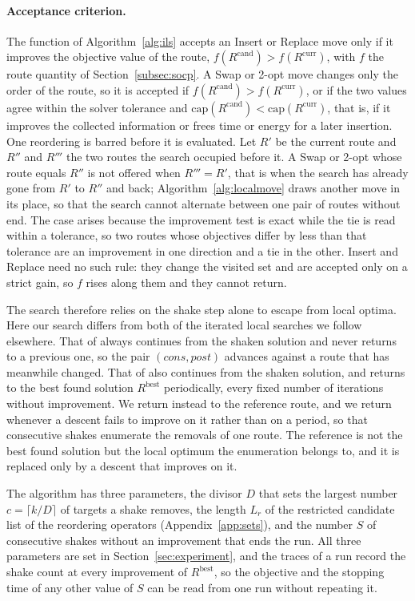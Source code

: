 \documentclass[11pt]{article}
\newcommand{\Rcurr}{R^{\mathrm{curr}}}   %
\newcommand{\Rcand}{R^{\mathrm{cand}}}   %
\newcommand{\Rbest}{R^{\mathrm{best}}}   %
\begin{document}
\paragraph{Acceptance criterion.}
The function \FAccept{$\Rcand, \Rcurr$} of Algorithm~\ref{alg:ils} accepts an Insert or Replace move only if it improves the objective value of the route, $f(\Rcand) > f(\Rcurr)$, with $f$ the route quantity of Section~\ref{subsec:socp}. A Swap or 2-opt move changes only the order of the route, so it is accepted if $f(\Rcand) > f(\Rcurr)$, or if the two values agree within the solver tolerance and $\mathrm{cap}(\Rcand) < \mathrm{cap}(\Rcurr)$, that is, if it improves the collected information or frees time or energy for a later insertion. One reordering is barred before it is evaluated. Let $R'$ be the current route and $R''$ and $R'''$ the two routes the search occupied before it. A Swap or 2-opt whose route equals $R''$ is not offered when $R''' = R'$, that is when the search has already gone from $R'$ to $R''$ and back; Algorithm~\ref{alg:localmove} draws another move in its place, so that the search cannot alternate between one pair of routes without end. The case arises because the improvement test is exact while the tie is read within a tolerance, so two routes whose objectives differ by less than that tolerance are an improvement in one direction and a tie in the other. Insert and Replace need no such rule: they change the visited set and are accepted only on a strict gain, so $f$ rises along them and they cannot return.

The search therefore relies on the shake step alone to escape from local optima. Here our search differs from both of the iterated local searches we follow elsewhere. That of \citep{vansteenwegen2009iterated} always continues from the shaken solution and never returns to a previous one, so the pair $(\mathit{cons}, \mathit{post})$ advances against a route that has meanwhile changed. That of \citep{gunawan2015iterated} also continues from the shaken solution, and returns to the best found solution $\Rbest$ periodically, every fixed number of iterations without improvement. We return instead to the reference route, and we return whenever a descent fails to improve on it rather than on a period, so that consecutive shakes enumerate the removals of one route. The reference is not the best found solution but the local optimum the enumeration belongs to, and it is replaced only by a descent that improves on it.

The algorithm has three parameters, the divisor $D$ that sets the largest number $c = \lceil k / D \rceil$ of targets a shake removes, the length $L_r$ of the restricted candidate list of the reordering operators (Appendix~\ref{app:sets}), and the number $S$ of consecutive shakes without an improvement that ends the run. All three parameters are set in Section~\ref{sec:experiment}, and the traces of a run record the shake count at every improvement of $\Rbest$, so the objective and the stopping time of any other value of $S$ can be read from one run without repeating it.
\end{document}
